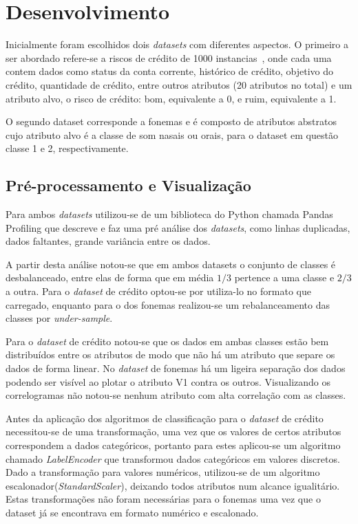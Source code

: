 \chapter{Desenvolvimento}\label{cap_desenv}

Inicialmente foram escolhidos dois \textit{datasets} com diferentes aspectos. O primeiro a ser abordado refere-se a riscos de crédito de 1000 instancias~\cite{Dua:2019}, onde cada uma contem dados como status da conta corrente, histórico de crédito, objetivo do crédito, quantidade de crédito, entre outros atributos (20 atributos no total) e um atributo alvo, o risco de crédito: bom, equivalente a 0, e ruim, equivalente a 1.

O segundo dataset corresponde a fonemas e é composto de atributos abstratos cujo atributo alvo é a classe de som nasais ou orais, para o dataset em questão classe 1 e 2, respectivamente. 

\section{Pré-processamento e Visualização}
Para ambos \textit{datasets} utilizou-se de um biblioteca do Python chamada Pandas Profiling que descreve e faz uma pré análise dos \textit{datasets}, como linhas duplicadas, dados faltantes, grande variância entre os dados.

A partir desta análise notou-se que em ambos datasets o conjunto de classes é desbalanceado, entre elas de forma que em média $1/3$ pertence a uma classe e $2/3$ a outra. Para o \textit{dataset} de crédito optou-se por utiliza-lo no formato que carregado, enquanto para o dos fonemas realizou-se um rebalanceamento das classes por \textit{under-sample}.

Para o \textit{dataset} de crédito notou-se que os dados em ambas classes estão bem distribuídos entre os atributos de modo que não há um atributo que separe os dados de forma linear. No \textit{dataset} de fonemas há um ligeira separação dos dados podendo ser visível ao plotar o atributo V1 contra os outros. Visualizando os correlogramas não notou-se nenhum atributo com alta correlação com as classes.

Antes da aplicação dos algoritmos de classificação para o \textit{dataset} de crédito necessitou-se de uma transformação, uma vez que os valores de certos atributos correspondem a dados categóricos, portanto para estes aplicou-se um algoritmo chamado \textit{LabelEncoder} que transformou dados categóricos em valores discretos. Dado a transformação para valores numéricos, utilizou-se de um algoritmo escalonador(\textit{StandardScaler}), deixando todos atributos num alcance igualitário. Estas transformações não foram necessárias para o fonemas uma vez que o dataset já se encontrava em formato numérico e escalonado.

